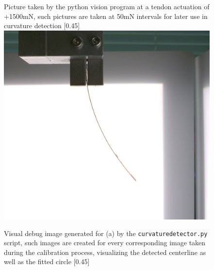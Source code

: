 \begin{figure}[H]
    \centering
    \begin{subcaptionbox}{Picture taken by the python vision program at a tendon actuation of +1500mN, such pictures are taken at 50mN intervals for later use in curvature detection \label{fig:pictureRibbon}}[0.45\linewidth]
        {\includegraphics[width=\linewidth]{images/ribbonadapter/aircalib_right_tension1500_2025-06-17_17-36-39_cam23.png}}
    \end{subcaptionbox}
    \hspace{0.05\linewidth}
    \begin{subcaptionbox}{Visual debug image generated for (a) by the \texttt{curvaturedetector.py} script, such images are created for every corresponding image taken during the calibration process, visualizing the detected centerline as well as the fitted circle \label{fig:centerline}}[0.45\linewidth]

\end{subcaptionbox}
\end{figure}
